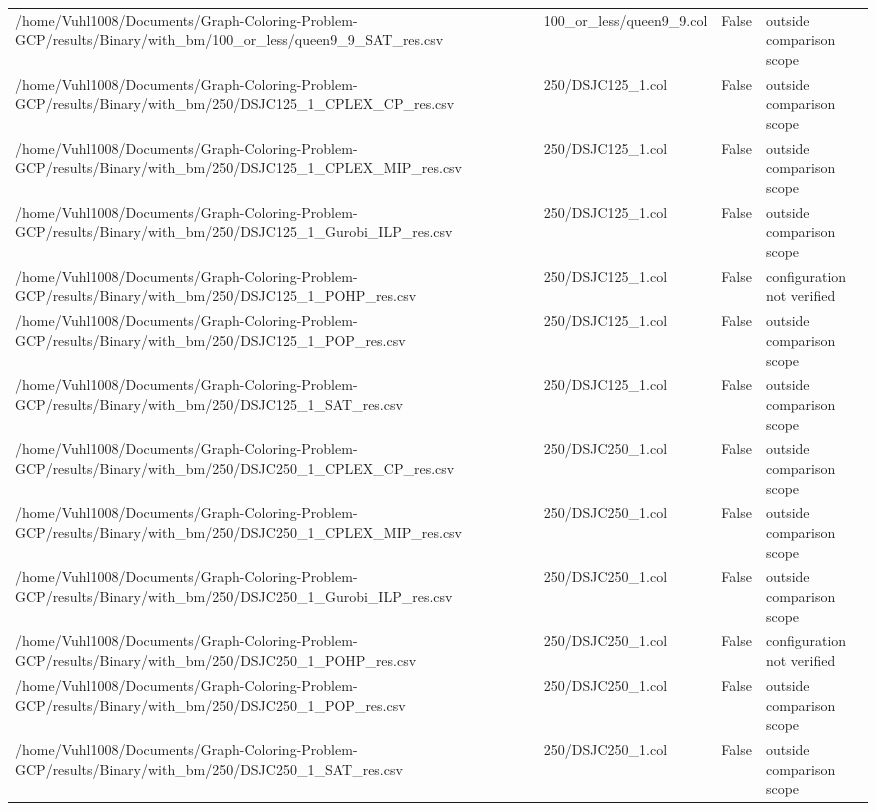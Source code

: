 \begin{table}[htbp]
\begin{tabular}{llll}
/home/Vuhl1008/Documents/Graph-Coloring-Problem-GCP/results/Binary/with\_bm/100\_or\_less/queen9\_9\_SAT\_res.csv & 100\_or\_less/queen9\_9.col & False & outside comparison scope \\
/home/Vuhl1008/Documents/Graph-Coloring-Problem-GCP/results/Binary/with\_bm/250/DSJC125\_1\_CPLEX\_CP\_res.csv & 250/DSJC125\_1.col & False & outside comparison scope \\
/home/Vuhl1008/Documents/Graph-Coloring-Problem-GCP/results/Binary/with\_bm/250/DSJC125\_1\_CPLEX\_MIP\_res.csv & 250/DSJC125\_1.col & False & outside comparison scope \\
/home/Vuhl1008/Documents/Graph-Coloring-Problem-GCP/results/Binary/with\_bm/250/DSJC125\_1\_Gurobi\_ILP\_res.csv & 250/DSJC125\_1.col & False & outside comparison scope \\
/home/Vuhl1008/Documents/Graph-Coloring-Problem-GCP/results/Binary/with\_bm/250/DSJC125\_1\_POHP\_res.csv & 250/DSJC125\_1.col & False & configuration not verified \\
/home/Vuhl1008/Documents/Graph-Coloring-Problem-GCP/results/Binary/with\_bm/250/DSJC125\_1\_POP\_res.csv & 250/DSJC125\_1.col & False & outside comparison scope \\
/home/Vuhl1008/Documents/Graph-Coloring-Problem-GCP/results/Binary/with\_bm/250/DSJC125\_1\_SAT\_res.csv & 250/DSJC125\_1.col & False & outside comparison scope \\
/home/Vuhl1008/Documents/Graph-Coloring-Problem-GCP/results/Binary/with\_bm/250/DSJC250\_1\_CPLEX\_CP\_res.csv & 250/DSJC250\_1.col & False & outside comparison scope \\
/home/Vuhl1008/Documents/Graph-Coloring-Problem-GCP/results/Binary/with\_bm/250/DSJC250\_1\_CPLEX\_MIP\_res.csv & 250/DSJC250\_1.col & False & outside comparison scope \\
/home/Vuhl1008/Documents/Graph-Coloring-Problem-GCP/results/Binary/with\_bm/250/DSJC250\_1\_Gurobi\_ILP\_res.csv & 250/DSJC250\_1.col & False & outside comparison scope \\
/home/Vuhl1008/Documents/Graph-Coloring-Problem-GCP/results/Binary/with\_bm/250/DSJC250\_1\_POHP\_res.csv & 250/DSJC250\_1.col & False & configuration not verified \\
/home/Vuhl1008/Documents/Graph-Coloring-Problem-GCP/results/Binary/with\_bm/250/DSJC250\_1\_POP\_res.csv & 250/DSJC250\_1.col & False & outside comparison scope \\
/home/Vuhl1008/Documents/Graph-Coloring-Problem-GCP/results/Binary/with\_bm/250/DSJC250\_1\_SAT\_res.csv & 250/DSJC250\_1.col & False & outside comparison scope \\

\end{tabular}
\end{table}
